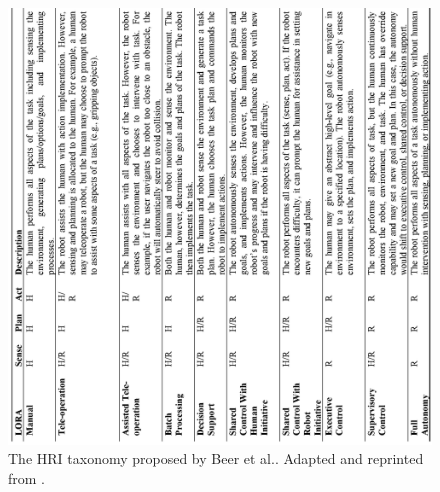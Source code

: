 \documentclass[a4paper,12pt,oneside,openright]{bhamthesis}
\begin{document}
\begin{figure}
	\centering
	\includegraphics[width=1\columnwidth]{BeerHRItaxonomy.png}
	\caption{The HRI taxonomy proposed by Beer et al.\cite{Beer2014}. Adapted and reprinted from \cite{Beer2014}.} 
	\label{fig:HRItaxonomy}
\end{figure}

\end{document}
